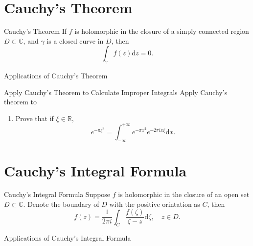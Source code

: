 
\section{Cauchy's Theorem}

\begin{theorem}{Cauchy's Theorem}{}
  If $f$ is holomorphic in the closure of a simply connected region $D \subset \mathbb{C}$,
  and $\gamma$ is a closed curve in $D$, then
  \begin{equation}
    \int_{\gamma} f(z)\mathrm{d} z = 0.
  \end{equation}
\end{theorem}

\begin{example}{Applications of Cauchy's Theorem}{}
  
\end{example}

\begin{example}{Apply Cauchy's Theorem to Calculate Improper Integrals}{}
  Apply Cauchy's theorem to 
  \begin{enumerate}
  \item Prove that if $\xi \in \mathbb{R}$,
    \begin{equation}
      e^{- \pi \xi^2} = \int_{-\infty}^{+\infty} e^{-\pi x^2} e^{-2\pi i x \xi} \mathrm{d} x.
    \end{equation}
  \end{enumerate}
\end{example}

\section{Cauchy's Integral Formula}

\begin{theorem}{Cauchy's Integral Formula}{}
  Suppose $f$ is holomorphic in the closure of an open set $D \subset \mathbb{C}$.
  Denote the boundary of $D$ with the positive orintation as $C$, then
  \begin{equation}
    f(z) = \frac{1}{2 \pi i} \int_C \frac{f(\zeta)}{\zeta - z}\mathrm{d} \zeta, \quad
    z \in D.
  \end{equation}
\end{theorem}

\begin{example}{Applications of Cauchy's Integral Formula}{}
  
\end{example}

